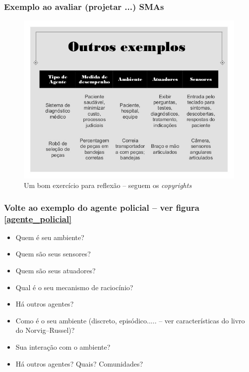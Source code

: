 
\begin{frame} %

 \frametitle{Exemplo ao avaliar (projetar ...) SMAs}

\begin{figure}[!ht]
  \centering
  \includegraphics[height =.7\textheight,width=.8\textwidth]
  {figuras/PEAS02.jpg}
  \caption{Um bom exercício para reflexão -- seguem os \textit{copyrights}}
\end{figure}

\end{frame}

\begin{frame} %

 \frametitle{Volte ao exemplo do agente policial -- ver figura \ref{agente_policial}}

\begin{itemize}
  \item Quem é seu ambiente?
  \item Quem são seus sensores?
    \item Quem são seus atuadores?
    \item Qual é o seu mecanismo de raciocínio?
    \item Há outros agentes?
    \item Como é o seu ambiente (discreto, episódico..... -- ver características do livro do Norvig--Russel)?
    \item Sua interação com o ambiente?
    \item Há outros agentes? Quais? Comunidades?
\end{itemize}


\end{frame}

